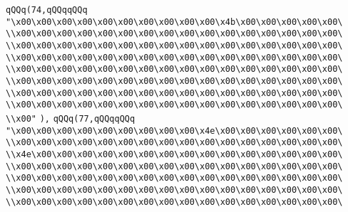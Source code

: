 \verb|qQQq(74,qQQqqQQq|\newline
\verb|"\x00\x00\x00\x00\x00\x00\x00\x00\x00\x00\x4b\x00\x00\x00\x00\x00\|\newline
\verb|\\x00\x00\x00\x00\x00\x00\x00\x00\x00\x00\x00\x00\x00\x00\x00\x00\|\newline
\verb|\\x00\x00\x00\x00\x00\x00\x00\x00\x00\x00\x00\x00\x00\x00\x00\x00\|\newline
\verb|\\x00\x00\x00\x00\x00\x00\x00\x00\x00\x00\x00\x00\x00\x00\x00\x00\|\newline
\verb|\\x00\x00\x00\x00\x00\x00\x00\x00\x00\x00\x00\x00\x00\x00\x00\x00\|\newline
\verb|\\x00\x00\x00\x00\x00\x00\x00\x00\x00\x00\x00\x00\x00\x00\x00\x00\|\newline
\verb|\\x00\x00\x00\x00\x00\x00\x00\x00\x00\x00\x00\x00\x00\x00\x00\x00\|\newline
\verb|\\x00\x00\x00\x00\x00\x00\x00\x00\x00\x00\x00\x00\x00\x00\x00\x00\|\newline
\verb|\\x00"|\newline
\verb|),|\newline
\verb|qQQq(77,qQQqqQQq|\newline
\verb|"\x00\x00\x00\x00\x00\x00\x00\x00\x00\x4e\x00\x00\x00\x00\x00\x00\|\newline
\verb|\\x00\x00\x00\x00\x00\x00\x00\x00\x00\x00\x00\x00\x00\x00\x00\x00\|\newline
\verb|\\x4e\x00\x00\x00\x00\x00\x00\x00\x00\x00\x00\x00\x00\x00\x00\x00\|\newline
\verb|\\x00\x00\x00\x00\x00\x00\x00\x00\x00\x00\x00\x00\x00\x00\x00\x00\|\newline
\verb|\\x00\x00\x00\x00\x00\x00\x00\x00\x00\x00\x00\x00\x00\x00\x00\x00\|\newline
\verb|\\x00\x00\x00\x00\x00\x00\x00\x00\x00\x00\x00\x00\x00\x00\x00\x00\|\newline
\verb|\\x00\x00\x00\x00\x00\x00\x00\x00\x00\x00\x00\x00\x00\x00\x00\x00\|\newline
